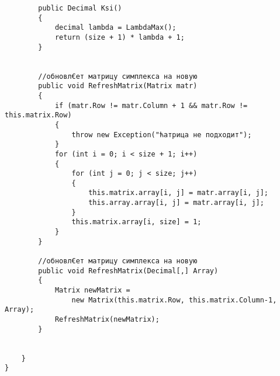 \documentclass[12pt]{article} %
\begin{document}
\begin{verbatim}
        public Decimal Ksi()
        {
            decimal lambda = LambdaMax();
            return (size + 1) * lambda + 1;
        }


        //обновл€ет матрицу симплекса на новую
        public void RefreshMatrix(Matrix matr) 
        {
            if (matr.Row != matr.Column + 1 && matr.Row != this.matrix.Row)
            {
                throw new Exception("ћатрица не подходит");
            }
            for (int i = 0; i < size + 1; i++)
            {
                for (int j = 0; j < size; j++)
                {
                    this.matrix.array[i, j] = matr.array[i, j];
                    this.array.array[i, j] = matr.array[i, j];
                }
                this.matrix.array[i, size] = 1;
            }
        }
        
        //обновл€ет матрицу симплекса на новую 
        public void RefreshMatrix(Decimal[,] Array)
        {
            Matrix newMatrix =
                new Matrix(this.matrix.Row, this.matrix.Column-1, Array);
            RefreshMatrix(newMatrix);
        }


    }
}

\end{verbatim}
\end{document}

